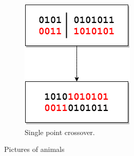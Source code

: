 \documentclass{article}
\begin{document}
\begin{figure}[h!]
\begin{subfigure}[b]{0.3\textwidth}
        \includegraphics[width=\textwidth]{"Double Point Crossover"}
        \caption{Single point crossover.}
        \label{fig:tiger}
    \end{subfigure}
    \caption{Pictures of animals}\label{fig:animals}
\end{figure}



% 
\end{document}
